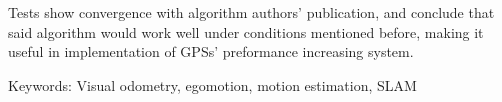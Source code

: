 Tests show convergence with algorithm authors' publication, and conclude that said algorithm would work well under conditions mentioned before, making it useful in implementation of GPSs' preformance increasing system.

Keywords: Visual odometry, egomotion, motion estimation, SLAM

\clearpage 